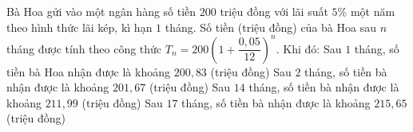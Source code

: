 \begin{ex}%
	Bà Hoa gửi vào một ngân hàng số tiền $200$ triệu đồng với lãi suất $5 \%$ một năm theo hình thức lãi kép,  kì hạn $1$ tháng. Số tiền (triệu đồng) của bà Hoa sau $n$ tháng được tính theo công thức $T_n=200\left(1+\dfrac{0{,}05}{12}\right)^n$. Khi đó:
	 \choiceTF
		{\True Sau $1$ tháng,  số tiền bà Hoa nhận được là khoảng $200{,}83$ (triệu đồng)}
		{\True Sau $2$ tháng, số tiền bà nhận được là  khoảng $201{,}67$ (triệu đồng)}
		{\True Sau $14$ tháng, số tiền bà nhận được là khoảng $211{,}99$ (triệu đồng)} 
		{Sau $17$  tháng, số tiền bà nhận được là khoảng $215{,}65$ (triệu đồng)}
\end{ex}



